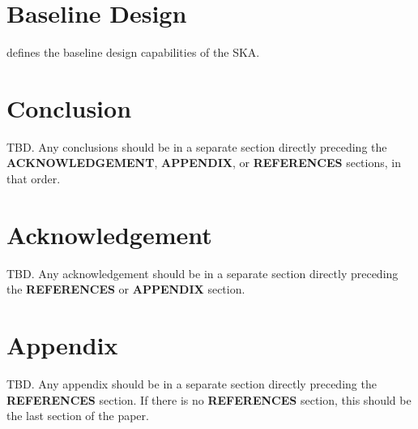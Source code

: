 \documentclass[a4paper,
               biblatex,       %
               keeplastbox,    %
               ]{jacow-2_1}    %
\newcommand\SEC[1]{\textbf{\uppercase{#1}}}
\begin{document}
\section{Baseline Design} %
\label{sec:baseline_design}

\cite{SKA-TEL-SKO-0000002_v3} defines the baseline 
design capabilities of the SKA.



\section{Conclusion} %
\label{sec:conclusion}
TBD. Any conclusions should be in a separate section directly preceding
the \SEC{Acknowledgement}, \SEC{Appendix}, or \SEC{References} sections, in that
order.


\section{Acknowledgement} %
\label{sec:acknowledgement}
TBD. Any acknowledgement should be in a separate section directly preceding
the \SEC{References} or \SEC{Appendix} section.


\section{Appendix} %
\label{sec:appendix}
TBD. Any appendix should be in a separate section directly preceding
the \SEC{References} section. If there is no \SEC{References} section,
this should be the last section of the paper.



\label{sec:references}
\printbibliography

\end{document}
